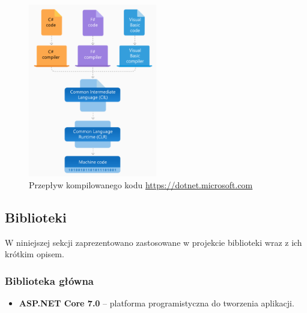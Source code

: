 \documentclass[a4paper,twoside,12pt]{book}
\begin{document}
\begin{figure}[h]
    \centering
    \includegraphics[width=0.5\textwidth]{compiler.png}
    \caption{Przepływ kompilowanego kodu \href{https://dotnet.microsoft.com/en-us/learn/dotnet/what-is-dotnet-framework}{https://dotnet.microsoft.com}}
    \label{Kompilator}
\end{figure}

\subsection{Biblioteki}
W niniejszej sekcji zaprezentowano zastosowane w projekcie biblioteki wraz z ich krótkim opisem.
\subsubsection{Biblioteka główna}
    \begin{itemize}
        \item \textbf{ASP.NET Core 7.0} -- platforma programistyczna do tworzenia aplikacji.
    \end{itemize}
\end{document}
